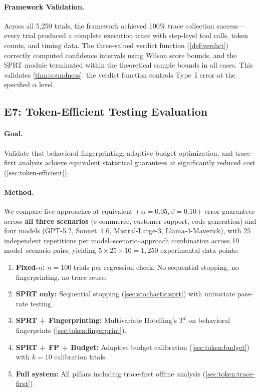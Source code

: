 \paragraph{Framework Validation.}
Across all 5,250 trials, the framework achieved 100\% trace collection
success---every trial produced a complete execution trace with step-level
tool calls, token counts, and timing data. The three-valued verdict
function (\cref{def:verdict}) correctly computed confidence intervals
using Wilson score bounds, and the SPRT module terminated within the
theoretical sample bounds in all cases. This validates
\cref{thm:soundness}: the verdict function controls Type~I error at the
specified $\alpha$ level.

\subsection{E7: Token-Efficient Testing Evaluation}
\label{sec:experiments:e7}

\paragraph{Goal.} Validate that behavioral fingerprinting, adaptive
budget optimization, and trace-first analysis achieve equivalent
statistical guarantees at significantly reduced cost
(\cref{sec:token-efficient}).

\paragraph{Method.}
We compare five approaches at equivalent $(\alpha = 0.05, \beta = 0.10)$
error guarantees across \textbf{all three scenarios} (e-commerce,
customer support, code generation) and four models (GPT-5.2,
Sonnet~4.6, Mistral-Large-3, Llama-4-Maverick), with 25 independent
repetitions per model--scenario--approach combination across 10
model--scenario pairs, yielding
$5 \times 25 \times 10 = 1{,}250$ experimental data points:
\begin{enumerate}[leftmargin=*]
  \item \textbf{Fixed-$n$:} $n = 100$ trials per regression check.
    No sequential stopping, no fingerprinting, no trace reuse.
  \item \textbf{SPRT only:} Sequential stopping
    (\cref{sec:stochastic:sprt}) with univariate pass-rate testing.
  \item \textbf{SPRT + Fingerprinting:} Multivariate Hotelling's $T^2$
    on behavioral fingerprints (\cref{sec:token:fingerprint}).
  \item \textbf{SPRT + FP + Budget:} Adaptive budget calibration
    (\cref{sec:token:budget}) with $k = 10$ calibration trials.
  \item \textbf{Full system:} All pillars including trace-first offline
    analysis (\cref{sec:token:trace-first}).
\end{enumerate}

